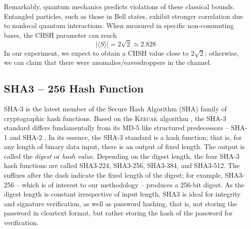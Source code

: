 \documentclass[a4paper]{cas-sc}
\begin{document}
Remarkably, quantum mechanics predicts violations of these classical bounds. Entangled particles, such as those in Bell states, exhibit stronger correlation due to nonlocal quantum interactions. When measured in specific non-commuting bases, the CHSH parameter can reach
\[
    \left| \langle S \rangle \right| = 2\sqrt{2} \approx 2.828
\]
In our experiment, we expect to obtain a CHSH value close to \( 2\sqrt{2} \); otherwise, we can claim that there were anomalies/eavesdroppers in the channel.
\subsection{SHA3 -- 256 Hash Function}
\label{sec:sha3}
SHA-3 is the latest member \cite{nistHashFunctions} of the Secure Hash Algorithm (SHA) family of cryptographic hash functions. Based on the K\textsc{eecak} algorithm \cite{Bbbbbbb2011}, the SHA-3 standard differs fundamentally from its MD-5 \cite{rivest1992md5} like structured predecessors -- SHA-1 and SHA-2 \cite{penard2008secure}. In its essence, the SHA-3 standard is a hash function; that is, for any length of binary data input, there is an output of fixed length. The output is called the \textit{digest} or \textit{hash value}. Depending on the digest length, the four SHA-3 hash functions are called SHA3-224, SHA3-256, SHA3-384, and SHA3-512. The suffixes after the dash indicate the fixed length of the digest; for example, SHA3-256 -- which is of interest to our methodology -- produces a 256-bit digest. As the digest length is constant irrespective of input length, SHA3 is ideal for integrity and signature verification, as well as password hashing, that is, not storing the password in cleartext format, but rather storing the hash of the password for verification.
\end{document}
